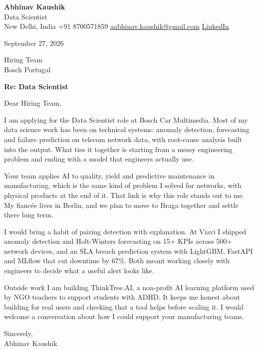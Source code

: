 \documentclass[11pt,a4paper]{article}
\begin{document}
{\Large\bfseries Abhinav Kaushik}\\
Data Scientist\\
New Delhi, India \textbar{} +91 8700571859 \textbar{} \href{mailto:aabhinav.kaushik@gmail.com}{aabhinav.kaushik@gmail.com} \textbar{} \href{https://www.linkedin.com/in/abhinav-kaushik10/}{LinkedIn}  

September 27, 2026

Hiring Team\\
Bosch Portugal

\textbf{Re: Data Scientist}

Dear Hiring Team,

I am applying for the Data Scientist role at Bosch Car Multimedia. Most of my data science work has been on technical systems: anomaly detection, forecasting and failure prediction on telecom network data, with root-cause analysis built into the output. What ties it together is starting from a messy engineering problem and ending with a model that engineers actually use.

Your team applies AI to quality, yield and predictive maintenance in manufacturing, which is the same kind of problem I solved for networks, with physical products at the end of it. That link is why this role stands out to me. My fiancée lives in Berlin, and we plan to move to Braga together and settle there long term.

I would bring a habit of pairing detection with explanation. At Viavi I shipped anomaly detection and Holt-Winters forecasting on 15+ KPIs across 500+ network devices, and an SLA breach prediction system with LightGBM, FastAPI and MLflow that cut downtime by 67\%. Both meant working closely with engineers to decide what a useful alert looks like.

Outside work I am building ThinkTree.AI, a non-profit AI learning platform used by NGO teachers to support students with ADHD. It keeps me honest about building for real users and checking that a tool helps before scaling it. I would welcome a conversation about how I could support your manufacturing teams.

Sincerely,\\[4pt]
Abhinav Kaushik
\end{document}
